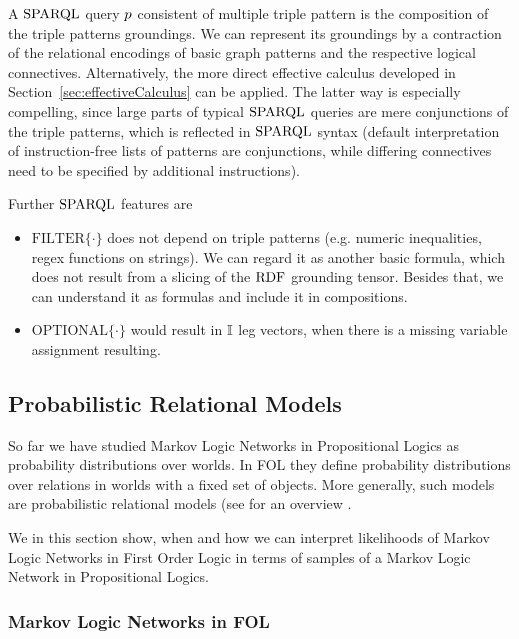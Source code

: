 A $\mathrm{SPARQL}$ query $p$ consistent of multiple triple pattern is the composition of the triple patterns groundings.
We can represent its groundings by a contraction of the relational encodings of basic graph patterns and the respective logical connectives.
Alternatively, the more direct effective calculus developed in Section~\ref{sec:effectiveCalculus} can be applied.
The latter way is especially compelling, since large parts of typical $\mathrm{SPARQL}$ queries are mere conjunctions of the triple patterns, which is reflected in $\mathrm{SPARQL}$ syntax (default interpretation of instruction-free lists of patterns are conjunctions, while differing connectives need to be specified by additional instructions).



Further $\mathrm{SPARQL}$ features are
\begin{itemize}
	\item $\mathrm{FILTER}\{\cdot\}$ does not depend on triple patterns (e.g. numeric inequalities, regex functions on strings). 
		We can regard it as another basic formula, which does not result from a slicing of the $\mathrm{RDF}$ grounding tensor.
		Besides that, we can understand it as formulas and include it in compositions.
	\item $\mathrm{OPTIONAL}\{\cdot\}$ would result in $\mathbb{I}$ leg vectors, when there is a missing variable assignment resulting.
\end{itemize}







\subsection{Probabilistic Relational Models}

So far we have studied Markov Logic Networks in Propositional Logics as probability distributions over worlds.
In FOL they define probability distributions over relations in worlds with a fixed set of objects.
More generally, such models are probabilistic relational models (see for an overview \cite{getoor_introduction_2019}.

%
We in this section show, when and how we can interpret likelihoods of Markov Logic Networks in First Order Logic in terms of samples of a Markov Logic Network in Propositional Logics.

\subsubsection{Markov Logic Networks in FOL}

